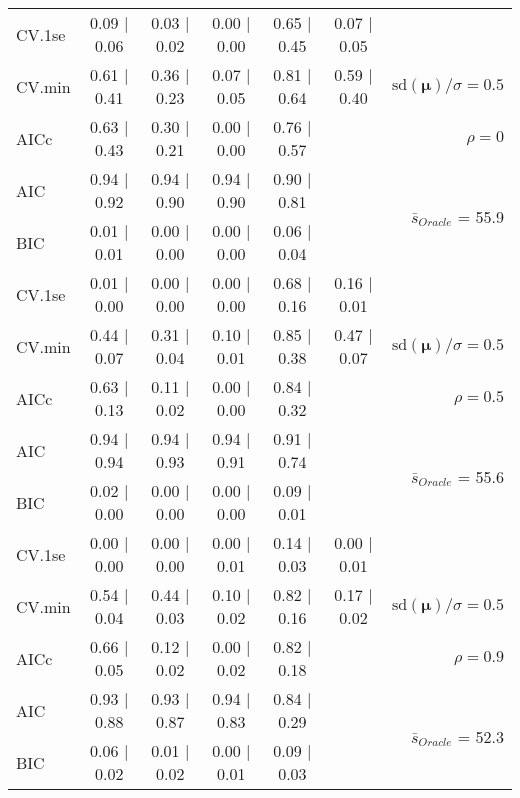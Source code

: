 \begin{table}
\begin{center}
\begin{tabular}{l*{5}{c}|r}
 \hline 
CV.1se & 0.09 $\mid$ 0.06 & 0.03 $\mid$ 0.02 & 0.00 $\mid$ 0.00 & 0.65 $\mid$ 0.45 & 0.07 $\mid$ 0.05 & \\
CV.min & 0.61 $\mid$ 0.41 & 0.36 $\mid$ 0.23 & 0.07 $\mid$ 0.05 & 0.81 $\mid$ 0.64 & 0.59 $\mid$ 0.40 &  $\mathrm{sd}(\mathbf{\mu})/\sigma=0.5$ \\
AICc & 0.63 $\mid$ 0.43 & 0.30 $\mid$ 0.21 & 0.00 $\mid$ 0.00 & 0.76 $\mid$ 0.57 & & $\rho=0$ \\
AIC & 0.94 $\mid$ 0.92 & 0.94 $\mid$ 0.90 & 0.94 $\mid$ 0.90 & 0.90 $\mid$ 0.81 & &  \multirow{2}{*}{$\bar{s}_{Oracle}$ = 55.9} \\
BIC & 0.01 $\mid$ 0.01 & 0.00 $\mid$ 0.00 & 0.00 $\mid$ 0.00 & 0.06 $\mid$ 0.04 & &  \\
 \hline 
CV.1se & 0.01 $\mid$ 0.00 & 0.00 $\mid$ 0.00 & 0.00 $\mid$ 0.00 & 0.68 $\mid$ 0.16 & 0.16 $\mid$ 0.01 & \\
CV.min & 0.44 $\mid$ 0.07 & 0.31 $\mid$ 0.04 & 0.10 $\mid$ 0.01 & 0.85 $\mid$ 0.38 & 0.47 $\mid$ 0.07 &  $\mathrm{sd}(\mathbf{\mu})/\sigma=0.5$ \\
AICc & 0.63 $\mid$ 0.13 & 0.11 $\mid$ 0.02 & 0.00 $\mid$ 0.00 & 0.84 $\mid$ 0.32 & & $\rho=0.5$ \\
AIC & 0.94 $\mid$ 0.94 & 0.94 $\mid$ 0.93 & 0.94 $\mid$ 0.91 & 0.91 $\mid$ 0.74 & &  \multirow{2}{*}{$\bar{s}_{Oracle}$ = 55.6} \\
BIC & 0.02 $\mid$ 0.00 & 0.00 $\mid$ 0.00 & 0.00 $\mid$ 0.00 & 0.09 $\mid$ 0.01 & &  \\
 \hline 
CV.1se & 0.00 $\mid$ 0.00 & 0.00 $\mid$ 0.00 & 0.00 $\mid$ 0.01 & 0.14 $\mid$ 0.03 & 0.00 $\mid$ 0.01 & \\
CV.min & 0.54 $\mid$ 0.04 & 0.44 $\mid$ 0.03 & 0.10 $\mid$ 0.02 & 0.82 $\mid$ 0.16 & 0.17 $\mid$ 0.02 &  $\mathrm{sd}(\mathbf{\mu})/\sigma=0.5$ \\
AICc & 0.66 $\mid$ 0.05 & 0.12 $\mid$ 0.02 & 0.00 $\mid$ 0.02 & 0.82 $\mid$ 0.18 & & $\rho=0.9$ \\
AIC & 0.93 $\mid$ 0.88 & 0.93 $\mid$ 0.87 & 0.94 $\mid$ 0.83 & 0.84 $\mid$ 0.29 & &  \multirow{2}{*}{$\bar{s}_{Oracle}$ = 52.3} \\
BIC & 0.06 $\mid$ 0.02 & 0.01 $\mid$ 0.02 & 0.00 $\mid$ 0.01 & 0.09 $\mid$ 0.03 & &  \\
 \hline 
\end{tabular}
\end{center}
\vspace{-1cm}
\end{table}




